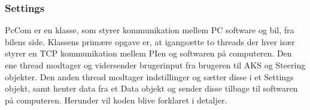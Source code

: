 \subsubsection{Settings} \label{sec:settings_impl}

PcCom er en klasse, som styrer kommunikation mellem PC software og bil, fra bilens side. Klassens primære opgave er, at igangsætte to threads der hver især styrer en TCP kommunikation mellem PIen og softwaren på computeren. Den ene thread modtager og vidersender brugerinput fra brugeren til AKS og Steering objekter. Den anden thread modtager indstillinger og sætter disse i et Settings objekt, samt henter data fra et Data objekt og sender disse tilbage til softwaren på computeren.
Herunder vil koden blive forklaret i detaljer.


%
%
%
%
